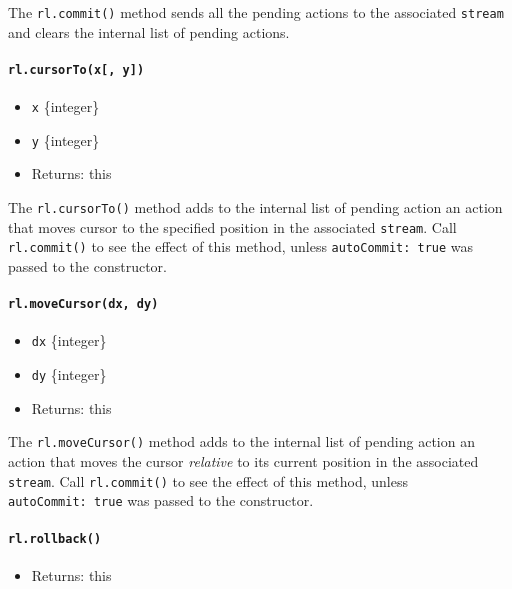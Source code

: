 The \texttt{rl.commit()} method sends all the pending actions to the
associated \texttt{stream} and clears the internal list of pending
actions.

\paragraph{\texorpdfstring{\texttt{rl.cursorTo(x{[},\ y{]})}}{rl.cursorTo(x{[}, y{]})}}\label{rl.cursortox-y}

\begin{itemize}
\tightlist
\item
  \texttt{x} \{integer\}
\item
  \texttt{y} \{integer\}
\item
  Returns: this
\end{itemize}

The \texttt{rl.cursorTo()} method adds to the internal list of pending
action an action that moves cursor to the specified position in the
associated \texttt{stream}. Call \texttt{rl.commit()} to see the effect
of this method, unless \texttt{autoCommit:\ true} was passed to the
constructor.

\paragraph{\texorpdfstring{\texttt{rl.moveCursor(dx,\ dy)}}{rl.moveCursor(dx, dy)}}\label{rl.movecursordx-dy}

\begin{itemize}
\tightlist
\item
  \texttt{dx} \{integer\}
\item
  \texttt{dy} \{integer\}
\item
  Returns: this
\end{itemize}

The \texttt{rl.moveCursor()} method adds to the internal list of pending
action an action that moves the cursor \emph{relative} to its current
position in the associated \texttt{stream}. Call \texttt{rl.commit()} to
see the effect of this method, unless \texttt{autoCommit:\ true} was
passed to the constructor.

\paragraph{\texorpdfstring{\texttt{rl.rollback()}}{rl.rollback()}}\label{rl.rollback}

\begin{itemize}
\tightlist
\item
  Returns: this
\end{itemize}

